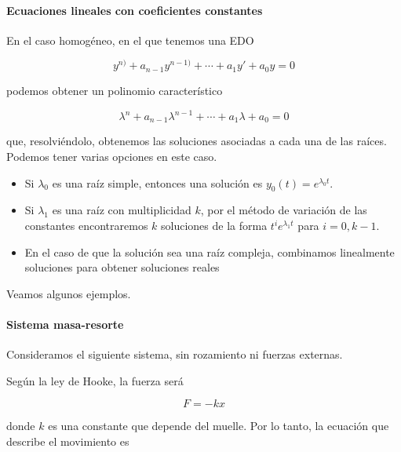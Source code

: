 \documentclass{mathnotes}
\begin{document}

\paragraph{Ecuaciones lineales con coeficientes constantes}

En el caso homogéneo, en el que tenemos una EDO

\[ y^{n)} + a_{n-1}y^{n-1)} + \dotsb + a_1y' + a_0 y = 0 \]

podemos obtener un polinomio característico 

\[ λ^n + a_{n-1}λ^{n-1} + \dotsb + a_1λ + a_0 = 0 \]

que, resolviéndolo, obtenemos las soluciones asociadas a cada una de las raíces. Podemos tener varias opciones en este caso. 

\begin{itemize}
\item Si $λ_0$ es una raíz simple, entonces una solución es $y_0(t) = e^{λ_0t}$.
\item Si $λ_1$ es una raíz con multiplicidad $k$, por el método de variación de las constantes encontraremos $k$ soluciones de la forma $t^ie^{λ_1t}$ para $i=0,k-1$.
\item En el caso de que la solución sea una raíz compleja, combinamos linealmente soluciones para obtener soluciones reales 
\end{itemize}

Veamos algunos ejemplos.

\paragraph{Sistema masa-resorte}

Consideramos el siguiente sistema, sin rozamiento ni fuerzas externas.

\begin{figure}
\end{figure}

Según la ley de Hooke, la fuerza será

\[ F = -kx \]

donde $k$ es una constante que depende del muelle. Por lo tanto, la ecuación que describe el movimiento es 
\end{document}
